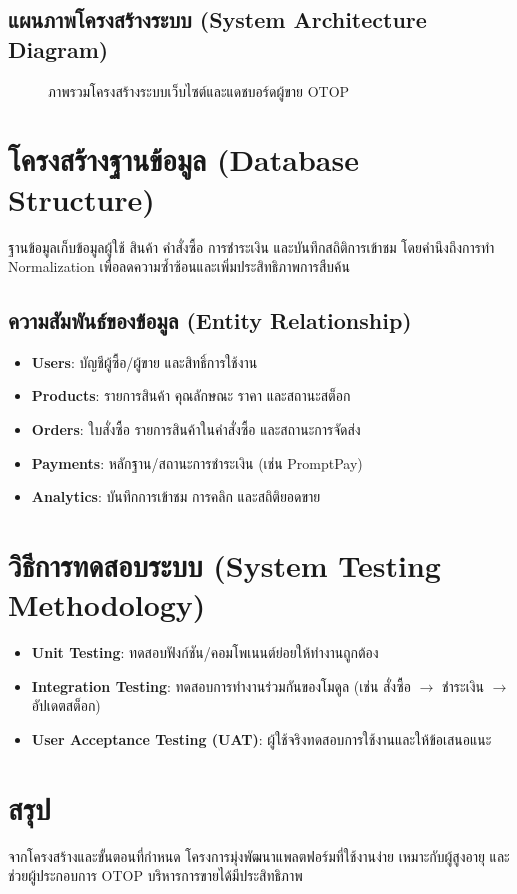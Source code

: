 \subsection{แผนภาพโครงสร้างระบบ (System Architecture Diagram)}
\begin{figure}[h]
  \centering
  \caption[System architecture]{ภาพรวมโครงสร้างระบบเว็บไซต์และแดชบอร์ดผู้ขาย OTOP}
  \label{fig:system-architecture}
\end{figure}

\section{โครงสร้างฐานข้อมูล (Database Structure)}
ฐานข้อมูลเก็บข้อมูลผู้ใช้ สินค้า คำสั่งซื้อ การชำระเงิน และบันทึกสถิติการเข้าชม \cite{pressman2014}
โดยคำนึงถึงการทำ Normalization เพื่อลดความซ้ำซ้อนและเพิ่มประสิทธิภาพการสืบค้น

\subsection{ความสัมพันธ์ของข้อมูล (Entity Relationship)}
\begin{itemize}
  \item \textbf{Users}: บัญชีผู้ซื้อ/ผู้ขาย และสิทธิ์การใช้งาน \cite{pressman2014}
  \item \textbf{Products}: รายการสินค้า คุณลักษณะ ราคา และสถานะสต็อก \cite{ecommerce2019}
  \item \textbf{Orders}: ใบสั่งซื้อ รายการสินค้าในคำสั่งซื้อ และสถานะการจัดส่ง \cite{ecommerce2019}
  \item \textbf{Payments}: หลักฐาน/สถานะการชำระเงิน (เช่น PromptPay) \cite{promptpay2021}
  \item \textbf{Analytics}: บันทึกการเข้าชม การคลิก และสถิติยอดขาย \cite{otop2020}
\end{itemize}

\section{วิธีการทดสอบระบบ (System Testing Methodology)}
\begin{itemize}
  \item \textbf{Unit Testing}: ทดสอบฟังก์ชัน/คอมโพเนนต์ย่อยให้ทำงานถูกต้อง \cite{pressman2014}
  \item \textbf{Integration Testing}: ทดสอบการทำงานร่วมกันของโมดูล (เช่น สั่งซื้อ \(\rightarrow\) ชำระเงิน \(\rightarrow\) อัปเดตสต็อก) \cite{pressman2014}
  \item \textbf{User Acceptance Testing (UAT)}: ผู้ใช้จริงทดสอบการใช้งานและให้ข้อเสนอแนะ \cite{ecommerce2019}
\end{itemize}

\section{สรุป}
จากโครงสร้างและขั้นตอนที่กำหนด โครงการมุ่งพัฒนาแพลตฟอร์มที่ใช้งานง่าย \cite{ecommerce2019}
เหมาะกับผู้สูงอายุ และช่วยผู้ประกอบการ OTOP บริหารการขายได้มีประสิทธิภาพ \cite{otop2020}
